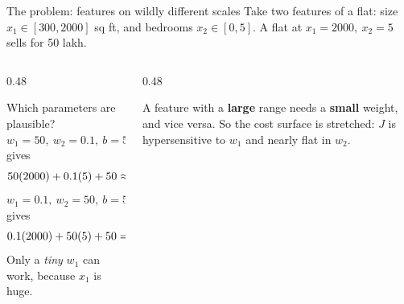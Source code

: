 \documentclass[aspectratio=169,10pt]{beamer}
\begin{document}
\begin{frame}{The problem: features on wildly different scales}
  \footnotesize
  Take two features of a flat: size $x_1 \in [300, 2000]$ sq ft, and bedrooms
  $x_2 \in [0,5]$. A flat at $x_1=2000,\ x_2=5$ sells for 50 lakh.
  \vspace{1mm}
  \begin{columns}[T,onlytextwidth]
    \begin{column}{0.48\textwidth}
      \begin{block}{Which parameters are plausible?}
        $w_1=50,\ w_2=0.1,\ b=50$ gives
        \[ 50(2000)+0.1(5)+50 \approx 100{,}050 \quad\text{\alert{far too large}} \]
        $w_1=0.1,\ w_2=50,\ b=50$ gives
        \[ 0.1(2000)+50(5)+50 = 500 \quad\text{\alert{still too large}} \]
        Only a \emph{tiny} $w_1$ can work, because $x_1$ is huge.
      \end{block}
    \end{column}
    \begin{column}{0.48\textwidth}
      \begin{keyidea}
        A feature with a \textbf{large} range needs a \textbf{small} weight, and vice versa.
        So the cost surface is stretched: $J$ is hypersensitive to $w_1$ and nearly flat
        in $w_2$.
      \end{keyidea}
    \end{column}
  \end{columns}
\end{frame}
\end{document}
